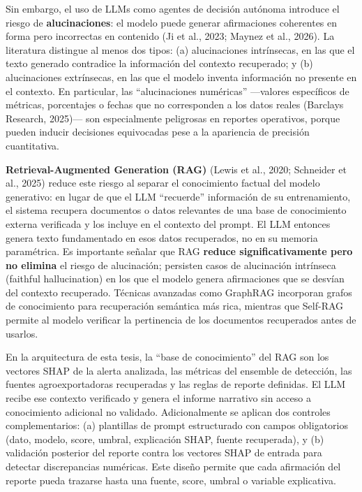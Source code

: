 Sin embargo, el uso de LLMs como agentes de decisión autónoma introduce
el riesgo de \textbf{alucinaciones}: el modelo puede generar
afirmaciones coherentes en forma pero incorrectas en contenido (Ji et
al., 2023; Maynez et al., 2026). La literatura distingue al menos dos
tipos: (a) alucinaciones intrínsecas, en las que el texto generado
contradice la información del contexto recuperado; y (b) alucinaciones
extrínsecas, en las que el modelo inventa información no presente en el
contexto. En particular, las ``alucinaciones numéricas'' ---valores
específicos de métricas, porcentajes o fechas que no corresponden a los
datos reales (Barclays Research, 2025)--- son especialmente peligrosas
en reportes operativos, porque pueden inducir decisiones equivocadas
pese a la apariencia de precisión cuantitativa.

\textbf{Retrieval-Augmented Generation (RAG)} (Lewis et al., 2020;
Schneider et al., 2025) reduce este riesgo al separar el conocimiento
factual del modelo generativo: en lugar de que el LLM ``recuerde''
información de su entrenamiento, el sistema recupera documentos o datos
relevantes de una base de conocimiento externa verificada y los incluye
en el contexto del prompt. El LLM entonces genera texto fundamentado en
esos datos recuperados, no en su memoria paramétrica. Es importante
señalar que RAG \textbf{reduce significativamente pero no elimina} el
riesgo de alucinación; persisten casos de alucinación intrínseca
(faithful hallucination) en los que el modelo genera afirmaciones que se
desvían del contexto recuperado. Técnicas avanzadas como GraphRAG
incorporan grafos de conocimiento para recuperación semántica más rica,
mientras que Self-RAG permite al modelo verificar la pertinencia de los
documentos recuperados antes de usarlos.

En la arquitectura de esta tesis, la ``base de conocimiento'' del RAG
son los vectores SHAP de la alerta analizada, las métricas del ensemble
de detección, las fuentes agroexportadoras recuperadas y las reglas de
reporte definidas. El LLM recibe ese contexto verificado y genera el
informe narrativo sin acceso a conocimiento adicional no validado.
Adicionalmente se aplican dos controles complementarios: (a) plantillas
de prompt estructurado con campos obligatorios (dato, modelo, score,
umbral, explicación SHAP, fuente recuperada), y (b) validación posterior
del reporte contra los vectores SHAP de entrada para detectar
discrepancias numéricas. Este diseño permite que cada afirmación del
reporte pueda trazarse hasta una fuente, score, umbral o variable
explicativa.

